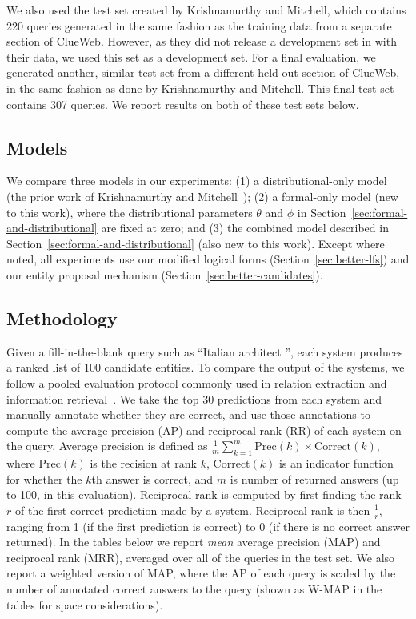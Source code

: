 \documentclass[11pt]{article}
\newcommand{\secref}[1]{Section~\ref{sec:#1}}
\newcommand{\blank}{\underline{\hspace{.5cm}}}
\begin{document}
We also used the test set created by Krishnamurthy and Mitchell, which
contains 220 queries generated in the same fashion as the training
data from a separate section of ClueWeb.  However, as they did not
release a development set in with their data, we used this set as a
development set.  For a final evaluation, we generated another,
similar test set from a different held out section of ClueWeb, in the
same fashion as done by Krishnamurthy and Mitchell.  This final test
set contains 307 queries.  We report results on both of these test
sets below.

\subsection{Models}

We compare three models in our experiments: (1) a distributional-only
model (the prior work of Krishnamurthy and
Mitchell~); (2)
a formal-only model (new to this work), where the distributional
parameters $\theta$ and $\phi$ in \secref{formal-and-distributional}
are fixed at zero; and (3) the combined model described in
\secref{formal-and-distributional} (also new to this work).  Except
where noted, all experiments use our modified logical forms
(\secref{better-lfs}) and our entity proposal mechanism
(\secref{better-candidates}).

\subsection{Methodology}

Given a fill-in-the-blank query such as ``Italian architect
\blank{}'', each system produces a ranked list of 100 candidate
entities.  To compare the output of the systems, we follow a pooled
evaluation protocol commonly used in relation extraction and
information
retrieval~\cite{west-2014-kbc-via-qa,riedel-2013-mf-universal-schema}.
We take the top 30 predictions from each system and manually annotate
whether they are correct, and use those annotations to compute the
average precision (AP) and reciprocal rank (RR) of each system on the
query.  Average precision is defined as $\frac{1}{m}\sum^m_{k=1}
\mathrm{Prec}(k) \times \mathrm{Correct}(k)$, where $\mathrm{Prec}(k)$
is the recision at rank $k$, $\mathrm{Correct}(k)$ is an indicator
function for whether the $k$th answer is correct, and $m$ is number of
returned answers (up to 100, in this evaluation).  Reciprocal rank is
computed by first finding the rank $r$ of the first correct prediction
made by a system.  Reciprocal rank is then $\frac{1}{r}$, ranging from
1 (if the first prediction is correct) to 0 (if there is no correct
answer returned).  In the tables below we report \emph{mean} average
precision (MAP) and reciprocal rank (MRR), averaged over all of the
queries in the test set.  We also report a weighted version of MAP,
where the AP of each query is scaled by the number of annotated
correct answers to the query (shown as W-MAP in the tables for space
considerations).
\end{document}
